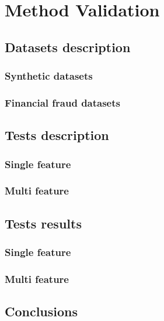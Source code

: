 \chapter{Method Validation} \label{chap:validation} \minitoc

\section{Datasets description}
\subsection{Synthetic datasets}
\subsection{Financial fraud datasets}

\section{Tests description}
\subsection{Single feature}
\subsection{Multi feature}

\section{Tests results}
\subsection{Single feature}
\subsection{Multi feature}

\section{Conclusions}
